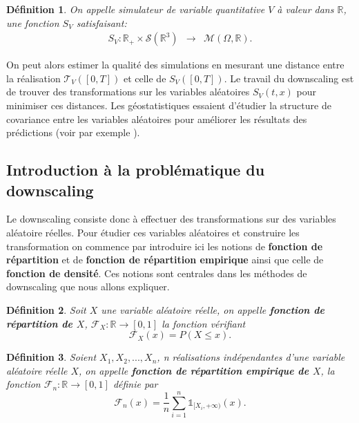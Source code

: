 \documentclass[a4paper,11pt]{article}
\newtheorem{definition}{Définition}
\begin{document}
\begin{definition}
	\label{simu_terre}
	On appelle simulateur de variable quantitative $V$ à valeur dans $\mathbb{R}$, une fonction $S_V$ satisfaisant:
	\begin{equation}
		\begin{array}{ccc}
			S_V: \mathbb{R}_{+}\times\mathcal{S}(\mathbb{R}^{3}) & \to & \mathcal{M}(\Omega,\mathbb{R}).
		\end{array}
	\end{equation}
\end{definition}

On peut alors estimer la qualité des simulations en mesurant une distance entre la réalisation $\mathcal{T}_V([0,T])$ et celle de $S_V([0,T])$. Le travail du downscaling est de trouver des transformations sur les variables aléatoires $S_V(t,x)$ pour minimiser ces distances. Les géostatistiques essaient d'étudier la structure de covariance entre les variables aléatoires pour améliorer les résultats des prédictions (voir par exemple \cite{lindgren2011explicit}).  

\subsection{Introduction à la problématique du downscaling}
\label{intro-dwnsc}
Le downscaling consiste donc à effectuer des transformations sur des variables aléatoire réelles. Pour étudier ces variables aléatoires et construire les transformation on commence par introduire ici les notions de \textbf{fonction de répartition} et de \textbf{fonction de répartition empirique} ainsi que celle de \textbf{fonction de densité}. Ces notions sont centrales dans les méthodes de downscaling que nous allons expliquer.

\begin{definition}
	Soit $X$ une variable aléatoire réelle, on appelle \textbf{fonction de répartition de $X$}, $\mathcal{F}_{X}: \mathbb{R}\to [0,1]$ la fonction vérifiant
	\begin{equation}
		\mathcal{F}_{X}(x)=P(X\leq x).
	\end{equation}
\end{definition}

\begin{definition}
	Soient $X_1,X_2,...,X_n$, n réalisations indépendantes d'une variable aléatoire réelle $X$, on appelle \textbf{fonction de répartition empirique de $X$}, la fonction $\mathcal{F}_{n}:\mathbb{R}\to [0,1]$ définie par
	\begin{equation}
		\mathcal{F}_{n}(x)= \frac{1}{n}\sum_{i=1}^{n}\mathds{1}_{[X_i, +\infty )}(x).
	\end{equation}
\end{definition}
\end{document}
